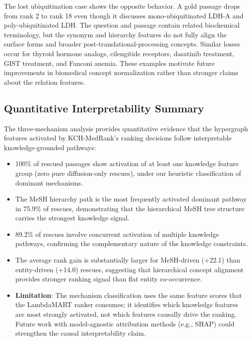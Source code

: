 The lost ubiquitination case shows the opposite behavior. A gold passage drops from rank 2 to rank 18 even though it discusses mono-ubiquitinated LDH-A and poly-ubiquitinated LDH. The question and passage contain related biochemical terminology, but the synonym and hierarchy features do not fully align the surface forms and broader post-translational-processing concepts. Similar losses occur for thyroid hormone analogs, cilengitide receptors, dasatinib treatment, GIST treatment, and Fanconi anemia. These examples motivate future improvements in biomedical concept normalization rather than stronger claims about the relation features.

\subsection{Quantitative Interpretability Summary}

The three-mechanism analysis provides quantitative evidence that the hypergraph features activated by KCH-MedRank's ranking decisions follow interpretable knowledge-grounded pathways:

\begin{itemize}
    \item 100\% of rescued passages show activation of at least one knowledge feature group (zero pure diffusion-only rescues), under our heuristic classification of dominant mechanisms.
    \item The MeSH hierarchy path is the most frequently activated dominant pathway in 75.9\% of rescues, demonstrating that the hierarchical MeSH tree structure carries the strongest knowledge signal.
    \item 89.2\% of rescues involve concurrent activation of multiple knowledge pathways, confirming the complementary nature of the knowledge constraints.
    \item The average rank gain is substantially larger for MeSH-driven (+22.1) than entity-driven (+14.0) rescues, suggesting that hierarchical concept alignment provides stronger ranking signal than flat entity co-occurrence.
    \item \textbf{Limitation}: The mechanism classification uses the same feature scores that the LambdaMART ranker consumes; it identifies which knowledge features are most strongly activated, not which features causally drive the ranking. Future work with model-agnostic attribution methods (e.g., SHAP) could strengthen the causal interpretability claim.
\end{itemize}

